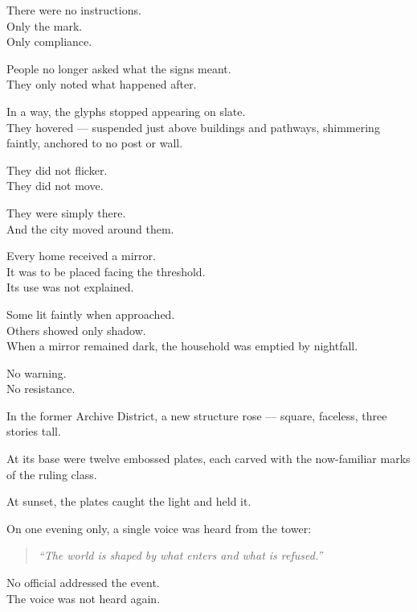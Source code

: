 \documentclass[9pt]{article}
\begin{document}
There were no instructions.\\
Only the mark.\\
Only compliance.

\vspace{1em}

People no longer asked what the signs meant.\\
They only noted what happened after.

\vspace{1em}

In a way, the glyphs stopped appearing on slate.\\
They hovered — suspended just above buildings and pathways, shimmering faintly, anchored to no post or wall.

They did not flicker.\\
They did not move.

They were simply there.\\
And the city moved around them.

\vspace{1em}

Every home received a mirror.\\
It was to be placed facing the threshold.\\
Its use was not explained.

Some lit faintly when approached.\\
Others showed only shadow.\\
When a mirror remained dark, the household was emptied by nightfall.

No warning.\\
No resistance.

\vspace{1em}

In the former Archive District, a new structure rose — square, faceless, three stories tall.

At its base were twelve embossed plates, each carved with the now-familiar marks of the ruling class.

At sunset, the plates caught the light and held it.

On one evening only, a single voice was heard from the tower:

\begin{quote}
\textit{“The world is shaped by what enters and what is refused.”}
\end{quote}

No official addressed the event.\\
The voice was not heard again.
\end{document}
